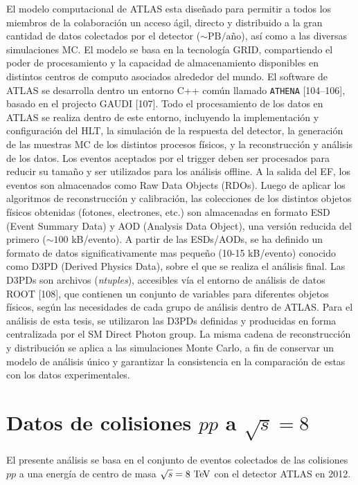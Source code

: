 El modelo computacional de ATLAS esta diseñado para permitir a todos los miembros
de la colaboración un acceso ágil, directo y distribuido a la gran cantidad de datos
colectados por el detector ($\sim \text{PB}/\text{a\~no}$), así como a las diversas
simulaciones MC. El modelo se basa en la tecnología GRID, compartiendo el poder de
procesamiento y la capacidad de almacenamiento disponibles en distintos centros de
computo asociados alrededor del mundo.
El software de ATLAS se desarrolla dentro un entorno C++ común llamado \texttt{ATHENA}
[104–106], basado en el projecto GAUDI [107]. Todo el procesamiento de los datos en
ATLAS se realiza dentro de este entorno, incluyendo la implementación y configuración
del HLT, la simulación de la respuesta del detector, la generación de las muestras MC de
los distintos procesos físicos, y la reconstrucción y análisis de los datos.
Los eventos aceptados por el trigger deben ser procesados para reducir su tamaño y
ser utilizados para los análisis offline. A la salida del EF, los eventos son almacenados
como Raw Data Objects (RDOs). Luego de aplicar los algoritmos de reconstrucción y
calibración, las colecciones de los distintos objetos físicos obtenidas (fotones, electrones,
etc.) son almacenadas en formato ESD (Event Summary Data) y AOD (Analysis Data
Object), una versión reducida del primero ($\sim 100$ kB/evento). A partir de las ESDs/AODs,
se ha definido un formato de datos significativamente mas pequeño (10-15 kB/evento)
conocido como D3PD (Derived Physics Data), sobre el que se realiza el análisis final. Las
D3PDs son archivos (\emph{ntuples}), accesibles vía el entorno de análisis de datos ROOT [108],
que contienen un conjunto de variables para diferentes objetos físicos, según las necesidades
de cada grupo de análisis dentro de ATLAS. Para el análisis de esta tesis, se utilizaron las
D3PDs definidas y producidas en forma centralizada por el SM Direct Photon group.
La misma cadena de reconstrucción y distribución se aplica a las simulaciones Monte
Carlo, a fin de conservar un modelo de análisis único y garantizar la consistencia en la
comparación de estas con los datos experimentales.


\section{Datos de colisiones $pp$ a $\sqrt{s} = 8$ \tev}

El presente análisis se basa en el conjunto de eventos colectados de las colisiones $pp$
a una energía de centro de masa  $\sqrt{s} = 8\tev$ con el detector ATLAS en 2012.

